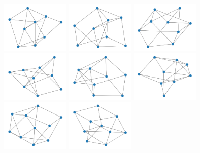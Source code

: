\includegraphics[width=3.25cm]{images/mfms/f4_12.png}
\includegraphics[width=3.25cm]{images/mfms/f4_13.png}
\includegraphics[width=3.25cm]{images/mfms/f4_14.png}
\includegraphics[width=3.25cm]{images/mfms/f4_15.png}
\includegraphics[width=3.25cm]{images/mfms/f4_16.png}
\includegraphics[width=3.25cm]{images/mfms/f4_17.png}
\includegraphics[width=3.25cm]{images/mfms/f4_18.png}
\includegraphics[width=3.25cm]{images/mfms/f4_19.png}
